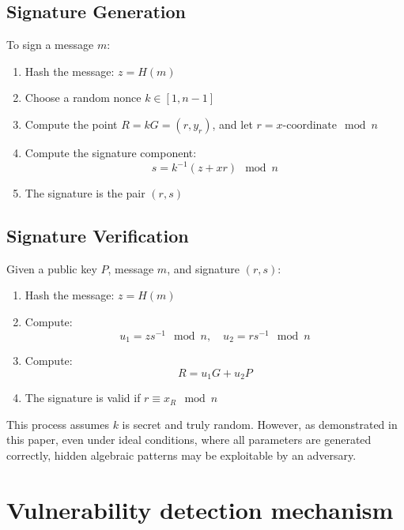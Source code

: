 \documentclass[11pt]{article}
\begin{document}
\subsection*{Signature Generation}
To sign a message \( m \):
\begin{enumerate}
  \item Hash the message: \( z = H(m) \)
  \item Choose a random nonce \( k \in [1, n-1] \)
  \item Compute the point \( R = kG = (r, y_r) \), and let \( r = x\text{-coordinate} \mod n \)
  \item Compute the signature component:
  \[
  s = k^{-1}(z + xr) \mod n
  \]
  \item The signature is the pair \( (r, s) \)
\end{enumerate}

\subsection*{Signature Verification}
Given a public key \( P \), message \( m \), and signature \( (r, s) \):
\begin{enumerate}
  \item Hash the message: \( z = H(m) \)
  \item Compute:
  \[
  u_1 = zs^{-1} \mod n,\quad u_2 = rs^{-1} \mod n
  \]
  \item Compute:
  \[
  R = u_1G + u_2P
  \]
  \item The signature is valid if \( r \equiv x_R \mod n \)
\end{enumerate}

This process assumes \( k \) is secret and truly random. However, as demonstrated in this paper, even under ideal conditions, where all parameters are generated correctly, hidden algebraic patterns may be exploitable by an adversary.

\section{Vulnerability detection mechanism}
\end{document}
